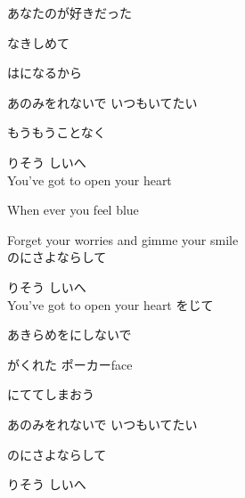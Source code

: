 {あなたのが好きだった

なきしめて

はになるから

あのみをれないで いつもいてたい

もうもうことなく

りそう しいへ
\\

You've got to open your heart

When ever you feel blue

Forget your worries and gimme your smile
\\

のにさよならして

りそう しいへ
\\

You've got to open your heart をじて

あきらめをにしないで

がくれた ポーカーface

にててしまおう

あのみをれないで いつもいてたい

のにさよならして

りそう しいへ

}
